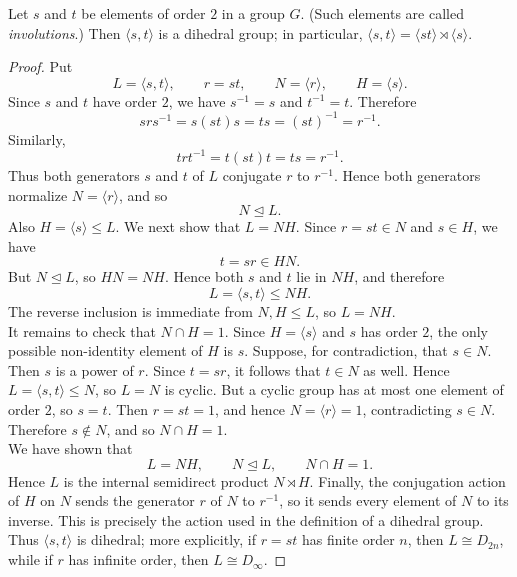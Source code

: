 \documentclass[../Odyssey_Project.tex]{subfiles}
\begin{document}
\begin{proposition}
\label{prop:2.13}
Let $s$ and $t$ be elements of order $2$ in a group $G$. (Such elements are called \emph{involutions}.) Then $\langle s,t \rangle$ is a dihedral group; in particular, $\langle s,t \rangle = \langle st \rangle \rtimes \langle s \rangle$.
\end{proposition}
\begin{proof}
    Put
    \[
        L = \langle s,t \rangle,
        \qquad
        r = st,
        \qquad
        N = \langle r \rangle,
        \qquad
        H = \langle s \rangle.
    \]
    Since $s$ and $t$ have order $2$, we have $s^{-1} = s$ and $t^{-1} = t$. Therefore
    \[
        srs^{-1} = s(st)s = ts = (st)^{-1} = r^{-1}.
    \]
    Similarly,
    \[
        trt^{-1} = t(st)t = ts = r^{-1}.
    \]
    Thus both generators $s$ and $t$ of $L$ conjugate $r$ to $r^{-1}$. Hence both generators normalize $N = \langle r \rangle$, and so
    \[
        N \trianglelefteq L.
    \]
    Also $H = \langle s \rangle \leq L$. We next show that $L = NH$. Since $r = st \in N$ and $s \in H$, we have
    \[
        t = sr \in HN.
    \]
    But $N \trianglelefteq L$, so $HN = NH$. Hence both $s$ and $t$ lie in $NH$, and therefore
    \[
        L = \langle s,t \rangle \leq NH.
    \]
    The reverse inclusion is immediate from $N,H \leq L$, so $L = NH$. \\
    It remains to check that $N \cap H = 1$. Since $H = \langle s \rangle$ and $s$ has order $2$, the only possible non-identity element of $H$ is $s$. Suppose, for contradiction, that $s \in N$. Then $s$ is a power of $r$. Since $t = sr$, it follows that $t \in N$ as well. Hence $L = \langle s,t \rangle \leq N$, so $L = N$ is cyclic. But a cyclic group has at most one element of order $2$, so $s = t$. Then $r = st = 1$, and hence $N = \langle r \rangle = 1$, contradicting $s \in N$. Therefore $s \notin N$, and so $N \cap H = 1$. \\
    We have shown that
    \[
        L = NH,
        \qquad
        N \trianglelefteq L,
        \qquad
        N \cap H = 1.
    \]
    Hence $L$ is the internal semidirect product $N \rtimes H$. Finally, the conjugation action of $H$ on $N$ sends the generator $r$ of $N$ to $r^{-1}$, so it sends every element of $N$ to its inverse. This is precisely the action used in the definition of a dihedral group. Thus $\langle s,t \rangle$ is dihedral; more explicitly, if $r = st$ has finite order $n$, then $L \cong D_{2n}$, while if $r$ has infinite order, then $L \cong D_\infty$.
\end{proof}
\end{document}
